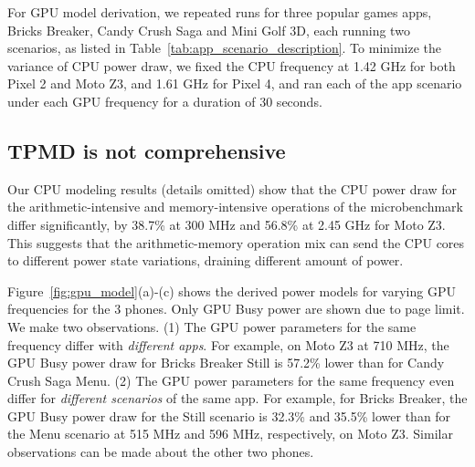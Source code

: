 For GPU model derivation, we repeated runs for three popular games apps,
Bricks Breaker, Candy Crush Saga and Mini Golf 3D, each running two
scenarios, as listed in Table~\ref{tab:app_scenario_description}.  To
minimize the variance of CPU power draw, we fixed the CPU frequency at
1.42 GHz for both Pixel 2 and Moto Z3, and 1.61 GHz for Pixel 4, and ran
each of the app scenario under each GPU frequency for a duration of 30
seconds.

\subsection{TPMD is not comprehensive}

Our CPU modeling results (details omitted) show that
the CPU power draw for the arithmetic-intensive and memory-intensive
operations of the microbenchmark differ significantly,
by 38.7\% at 300 MHz and 56.8\% at 2.45 GHz for Moto Z3.
This suggests that the arithmetic-memory operation mix can send the CPU cores
to different power state variations, draining different amount of power.

Figure~\ref{fig:gpu_model}(a)-(c) shows the derived power models 
for varying GPU frequencies for the 3 phones. 
Only GPU Busy power are shown due to page limit.
We make two observations.
%
(1) The GPU power parameters for the same frequency differ with {\it
different apps}. For example, on Moto Z3 at 710 MHz, the GPU Busy power draw for
Bricks Breaker Still is 57.2\% lower than for Candy Crush Saga Menu.
%
(2) The GPU power parameters for the same frequency even differ for
{\it different scenarios} of the same app. For example, for Bricks Breaker, the GPU
Busy power draw for the Still scenario is 32.3\% and 35.5\% lower than
for the Menu scenario at 515 MHz and 596 MHz, respectively, on Moto Z3.
Similar observations can be made about the other two phones.

